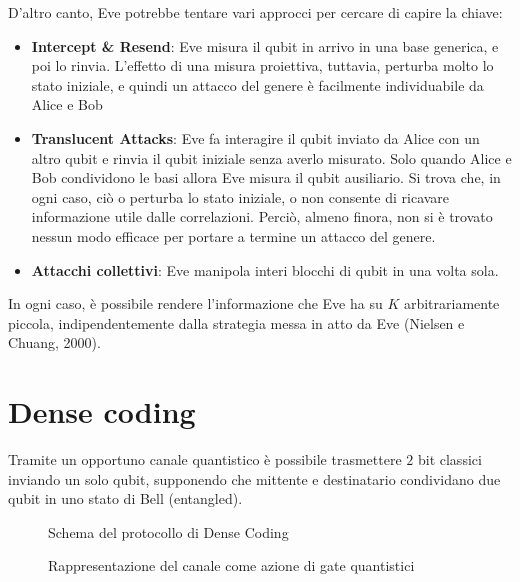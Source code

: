 \documentclass[../../InformazioneQuantistica.tex]{subfiles}
\begin{document}
D'altro canto, Eve potrebbe tentare vari approcci per cercare di capire la chiave:
\begin{itemize}
\item \textbf{Intercept \& Resend}: Eve misura il qubit in arrivo in una base generica, e poi lo rinvia. L'effetto di una misura proiettiva, tuttavia, perturba molto lo stato iniziale, e quindi un attacco del genere è facilmente individuabile da Alice e Bob
\item \textbf{Translucent Attacks}: Eve fa interagire il qubit inviato da Alice con un altro qubit  e rinvia il qubit iniziale senza averlo misurato. Solo quando Alice e Bob condividono le basi allora Eve misura il qubit ausiliario. Si trova che, in ogni caso, ciò o perturba lo stato iniziale, o non consente di ricavare informazione utile dalle correlazioni. Perciò, almeno finora, non si è trovato nessun modo efficace per portare a termine un attacco del genere.
\item \textbf{Attacchi collettivi}: Eve manipola interi blocchi di qubit in una volta sola. 
\end{itemize}

In ogni caso, è possibile rendere l'informazione che Eve ha su $K$ arbitrariamente piccola, indipendentemente dalla strategia messa in atto da Eve (Nielsen e Chuang, 2000).

\section{Dense coding}
Tramite un opportuno canale quantistico è possibile trasmettere $2$ bit classici inviando un solo qubit, supponendo che mittente e destinatario condividano due qubit in uno stato di Bell (entangled).

\begin{figure}[H]
\centering

\caption{Schema del protocollo di Dense Coding\label{fig:dense-coding}}
\end{figure}

\begin{figure}[H]
\centering

\caption{Rappresentazione del canale come azione di gate quantistici\label{fig:dense-coding-gates}}
\end{figure}
\end{document}

